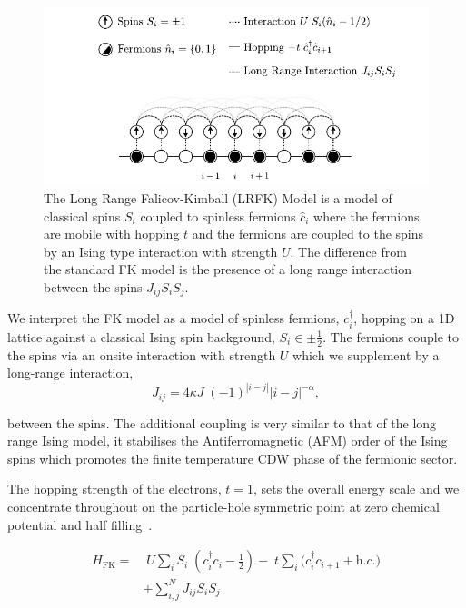 \hypertarget{fig:lrfk_schematic}{%
\begin{figure}
\centering
\includegraphics[width=1\textwidth,height=\textheight]{figure_code/intro_chapter/lrfk_schematic}
\caption[{Falicov-Kimball Model Diagram}]{The Long Range Falicov-Kimball (LRFK) Model is a model of classical spins \(S_i\) coupled to spinless fermions \(\hat{c}_i\) where the fermions are mobile with hopping \(t\) and the fermions are coupled to the spins by an Ising type interaction with strength \(U\). The difference from the standard FK model is the presence of a long range interaction between the spins \(J_{ij}S_i S_j\).}
\label{fig:lrfk_schematic}
\end{figure}
}

We interpret the FK model as a model of spinless fermions, \(c^\dagger_{i}\), hopping on a 1D lattice against a classical Ising spin background, \(S_i \in {\pm \frac{1}{2}}\). The fermions couple to the spins via an onsite interaction with strength \(U\) which we supplement by a long-range interaction, \[
J_{ij} = 4\kappa J\; (-1)^{|i-j|} |i-j|^{-\alpha},
\]

between the spins. The additional coupling is very similar to that of the long range Ising model, it stabilises the Antiferromagnetic (AFM) order of the Ising spins which promotes the finite temperature CDW phase of the fermionic sector.

The hopping strength of the electrons, \(t = 1\), sets the overall energy scale and we concentrate throughout on the particle-hole symmetric point at zero chemical potential and half filling~\autocite{gruberFalicovKimballModelReview1996}.

\[\begin{aligned}
H_{\mathrm{FK}} = & \;U \sum_{i} S_i\;(c^\dagger_{i}c_{i} - \tfrac{1}{2}) -\;t \sum_{i} (c^\dagger_{i}c_{i+1} + \textit{h.c.)}\\ 
 &  + \sum_{i, j}^{N} J_{ij}  S_i S_j
\label{eq:HFK}\end{aligned}\]

